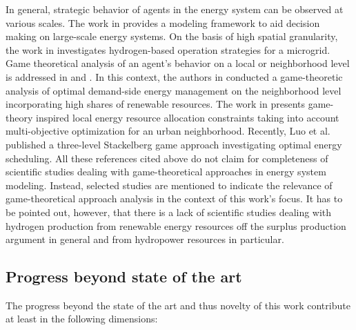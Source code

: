 \documentclass[review]{elsarticle}
\begin{document}
In general, strategic behavior of agents in the energy system can be observed at various scales. The work in \cite{girones2015strategic} provides a modeling framework to aid decision making on large-scale energy systems. On the basis of high spatial granularity, the work in \cite{khojasteh2020robust} investigates hydrogen-based operation strategies for a microgrid. Game theoretical analysis of an agent's behavior on a local or neighborhood level is addressed in \cite{jing2018multi} and \cite{fleischhacker2018sharing}. In this context, the authors in \cite{fernandez2018game} conducted a game-theoretic analysis of optimal demand-side energy management on the neighborhood level incorporating high shares of renewable resources. The work in \cite{jing2018multi} presents game-theory inspired local energy resource allocation constraints taking into account multi-objective optimization for an urban neighborhood. Recently, Luo et al. \cite{luo2020energy} published a three-level Stackelberg game approach investigating optimal energy scheduling. All these references cited above do not claim for completeness of scientific studies dealing with game-theoretical approaches in energy system modeling. Instead, selected studies are mentioned to indicate the relevance of game-theoretical approach analysis in the context of this work's focus. It has to be pointed out, however, that there is a lack of scientific studies dealing with hydrogen production from renewable energy resources off the surplus production argument in general and from hydropower resources in particular.

\subsection{Progress beyond state of the art}
The progress beyond the state of the art and thus novelty of this work contribute at least in the following dimensions:
\end{document}
